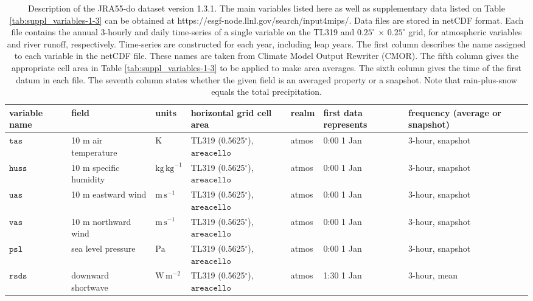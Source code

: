 \documentclass[dvipdfmx]{elsarticle_mod}
\begin{document}
\begin{table}[h]
\centering
\caption{Description of the JRA55-do dataset version 1.3.1. The main variables listed here as well as supplementary data listed on Table \ref{tab:suppl_variables-1-3} can be obtained at https://esgf-node.llnl.gov/search/input4mips/. Data files are stored in netCDF format. Each file contains the annual 3-hourly and daily time-series of a single variable on the TL319 and $0.25^{\circ}\,\times\,0.25^{\circ}$ grid, for atmospheric variables and river runoff, respectively. Time-series are constructed for each year, including leap years. The first column describes the name assigned to each variable in the netCDF file. These names are taken from Climate Model Output Rewriter (CMOR). The fifth column gives the appropriate cell area in Table \ref{tab:suppl_variables-1-3} to be applied to make area averages. The sixth column gives the time of the first datum in each file. The seventh column states whether the given field is an averaged property or a snapshot. Note that rain-plus-snow equals the total precipitation. \label{tab:main_variables-1-3}}
\begin{threeparttable}
\begin{tabular*}{17.5cm}{p{1.4cm}|p{3.3cm}|p{1.6cm}|p{2.5cm}|p{1.4cm}|p{1.5cm}|p{2.8cm}}
\hline
variable name & field & units & horizontal grid cell area\tnote{5} & realm & first data represents & frequency (average or snapshot) \\ \hline \hline
$\texttt{tas}$  &  10 m air temperature   & $\mathrm{K}$ & TL319 (0.5625$^{\circ}$), $\texttt{areacello}$ & atmos & 0:00 1 Jan & 3-hour, snapshot \\ \hline
$\texttt{huss}$ &  10 m specific humidity & $\mathrm{kg}\,\mathrm{kg}^{-1}$ & TL319 (0.5625$^{\circ}$), $\texttt{areacello}$ & atmos & 0:00 1 Jan & 3-hour, snapshot \\ \hline
$\texttt{uas}$  &  10 m eastward wind     & $\mathrm{m}\,\mathrm{s}^{-1}$ & TL319 (0.5625$^{\circ}$), $\texttt{areacello}$ & atmos & 0:00 1 Jan & 3-hour, snapshot \\ \hline
$\texttt{vas}$  &  10 m northward wind    & $\mathrm{m}\,\mathrm{s}^{-1}$ & TL319 (0.5625$^{\circ}$), $\texttt{areacello}$ & atmos & 0:00 1 Jan & 3-hour, snapshot \\ \hline
$\texttt{psl}$  &  sea level pressure     & $\mathrm{Pa}$ & TL319 (0.5625$^{\circ}$), $\texttt{areacello}$ & atmos & 0:00 1 Jan & 3-hour, snapshot \\ \hline
$\texttt{rsds}$ &  downward shortwave     & $\mathrm{W}\,\mathrm{m}^{-2}$ & TL319 (0.5625$^{\circ}$), $\texttt{areacello}$ & atmos & 1:30 1 Jan & 3-hour, mean \\ \hline

\end{tabular*}
\end{threeparttable}
\end{table}
\end{document}
